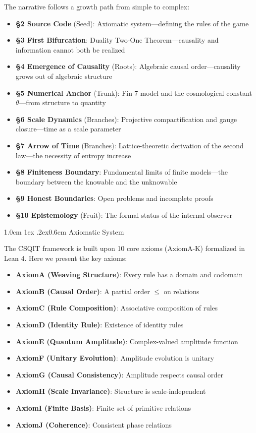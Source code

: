 \documentclass[aps,prd,twocolumn,nofootinbib,floatfix]{revtex4-2}
\makeatletter
\def\section{%
  \@startsection{section}{1}{\z@}
    {1.0cm \@plus1ex \@minus .2ex}{0.6cm}
    {\normalfont\large\bfseries\centering}%
}
\makeatother
\begin{document}
The narrative follows a growth path from simple to complex:

\begin{itemize}
    \item \textbf{\S 2 Source Code} (Seed): Axiomatic system---defining the rules of the game
    \item \textbf{\S 3 First Bifurcation}: Duality Two-One Theorem---causality and information cannot both be realized
    \item \textbf{\S 4 Emergence of Causality} (Roots): Algebraic causal order---causality grows out of algebraic structure
    \item \textbf{\S 5 Numerical Anchor} (Trunk): Fin 7 model and the cosmological constant $\theta$---from structure to quantity
    \item \textbf{\S 6 Scale Dynamics} (Branches): Projective compactification and gauge closure---time as a scale parameter
    \item \textbf{\S 7 Arrow of Time} (Branches): Lattice-theoretic derivation of the second law---the necessity of entropy increase
    \item \textbf{\S 8 Finiteness Boundary}: Fundamental limits of finite models---the boundary between the knowable and the unknowable
    \item \textbf{\S 9 Honest Boundaries}: Open problems and incomplete proofs
    \item \textbf{\S 10 Epistemology} (Fruit): The formal status of the internal observer
\end{itemize}

\section{Axiomatic System}

The CSQIT framework is built upon 10 core axioms (AxiomA-K) formalized in Lean 4. Here we present the key axioms:

\begin{itemize}
    \item \textbf{AxiomA (Weaving Structure)}: Every rule has a domain and codomain
    \item \textbf{AxiomB (Causal Order)}: A partial order $\le$ on relations
    \item \textbf{AxiomC (Rule Composition)}: Associative composition of rules
    \item \textbf{AxiomD (Identity Rule)}: Existence of identity rules
    \item \textbf{AxiomE (Quantum Amplitude)}: Complex-valued amplitude function
    \item \textbf{AxiomF (Unitary Evolution)}: Amplitude evolution is unitary
    \item \textbf{AxiomG (Causal Consistency)}: Amplitude respects causal order
    \item \textbf{AxiomH (Scale Invariance)}: Structure is scale-independent
    \item \textbf{AxiomI (Finite Basis)}: Finite set of primitive relations
    \item \textbf{AxiomJ (Coherence)}: Consistent phase relations
\end{itemize}
\end{document}
